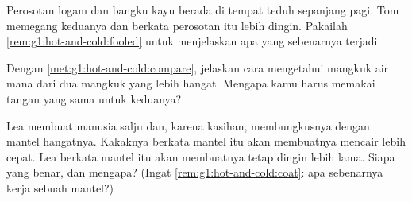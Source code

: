 \begin{exercise}[$\star$]\label{exo:g1:hot-and-cold:7}
Perosotan logam dan bangku kayu berada di tempat teduh sepanjang pagi.
Tom memegang keduanya dan berkata perosotan itu lebih dingin. Pakailah
\cref{rem:g1:hot-and-cold:fooled} untuk menjelaskan apa yang sebenarnya
terjadi.
\end{exercise}

\begin{exercise}[$\star$]\label{exo:g1:hot-and-cold:8}
Dengan \cref{met:g1:hot-and-cold:compare}, jelaskan cara mengetahui
mangkuk air mana dari dua mangkuk yang lebih hangat. Mengapa kamu
harus memakai tangan yang sama untuk keduanya?
\end{exercise}

\begin{exercise}[$\star\star$]\label{exo:g1:hot-and-cold:9}
Lea membuat manusia salju dan, karena kasihan, membungkusnya dengan
mantel hangatnya. Kakaknya berkata mantel itu akan membuatnya mencair
lebih cepat. Lea berkata mantel itu akan membuatnya tetap dingin lebih
lama. Siapa yang benar, dan mengapa? (Ingat
\cref{rem:g1:hot-and-cold:coat}: apa sebenarnya kerja sebuah mantel?)
\end{exercise}
